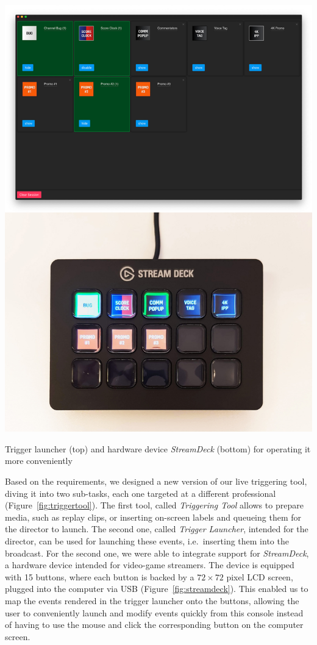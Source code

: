\documentclass[sigchi-a]{acmart}
\begin{document}
\begin{marginfigure}
    \includegraphics[width=\marginparwidth-10pt]{Figures/streamdeck.jpg}
    \caption{Trigger launcher (top) and hardware device \emph{StreamDeck} (bottom) for operating it more conveniently}
    \label{fig:streamdeck}
\end{marginfigure}

Based on the requirements, we designed a new version of our live triggering
tool, diving it into two sub-tasks, each one targeted at a different professional
(Figure~\ref{fig:triggertool}). The first tool, called \emph{Triggering Tool} allows to prepare media,
such as replay clips, or inserting on-screen labels and queueing
them for the director to launch. The second one, called \emph{Trigger Launcher}, intended for the director, can
be used for launching these events, i.e.\ inserting them into the broadcast.
For the second one, we were able to integrate support for \emph{StreamDeck}, a
hardware device intended for video-game streamers. The device is equipped with 15
buttons, where each button is backed by a $72\times72$ pixel LCD screen, plugged into the computer via USB
(Figure~\ref{fig:streamdeck}). This enabled us to map the events rendered in the
trigger launcher onto the buttons, allowing the user to conveniently launch and
modify events quickly from this console instead of having to use the mouse and
click the corresponding button on the computer screen.
\end{document}
